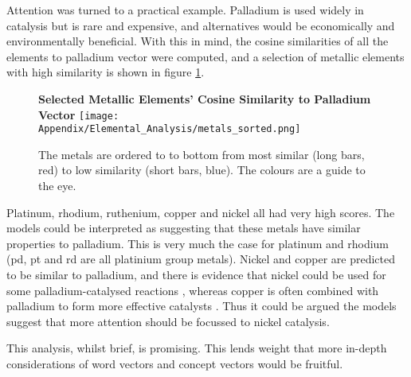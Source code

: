 Attention was turned to a practical example. Palladium is used widely in catalysis but is rare and expensive, and alternatives would be economically and environmentally beneficial\cite{palladium}. With this in mind, the cosine similarities of all the elements to palladium vector were computed, and a selection of metallic elements with high similarity is shown in figure \ref{fig:palladium}. 
\newpage
\begin{center}
\begin{figure}[H]
  \centering
  \textbf{Selected Metallic Elements' Cosine Similarity to Palladium Vector}
    \texttt{[image: Appendix/Elemental\_Analysis/metals\_sorted.png]}
    \caption[Selected metallic elements' cosine similarity to palladium vector]{The metals are ordered to to bottom from most similar (long bars, red) to low similarity (short bars, blue). The colours are a guide to the eye.}
    \label{fig:palladium}
\end{figure} 
\end{center}
\newpage
Platinum, rhodium, ruthenium, copper and nickel all had very high scores. The models could be interpreted as suggesting that these metals have similar properties to palladium. This is very much the case for platinum and rhodium (pd, pt and rd are all platinium group metals)\cite{pgm}. Nickel and copper are predicted to be similar to palladium, and there is evidence that nickel could be used for some palladium-catalysed reactions \cite{nickel}, whereas copper is often combined with palladium to form more effective catalysts \cite{copper}. Thus it could be argued the models suggest that more attention should be focussed to nickel catalysis.

This analysis, whilst brief, is promising. This lends weight that more in-depth considerations of word vectors and concept vectors would be fruitful.